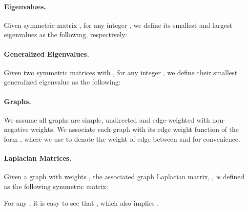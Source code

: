 \documentclass{article}
\def\ngap{}
\begin{document}
\paragraph{Eigenvalues.} Given symmetric matrix ,
for any integer , we define its  smallest and
largest eigenvalues as the following, respectively:
\quad\quad 

\paragraph{Generalized Eigenvalues.} Given two symmetric matrices
 with , for any integer , we define their  smallest generalized
eigenvalue as the following:
 
\paragraph{Graphs.} We assume all graphs are simple, undirected and
edge-weighted with non-negative weights. We associate each graph with
its edge weight function of the form , where
we use  to denote the weight of edge between  and  for
convenience.

\smallskip
\paragraph{Laplacian Matrices.} Given a graph with weights
, the associated graph Laplacian matrix, , is defined as the following symmetric matrix:
 
For any , it is easy to see that
, which also implies .
\ngap
\end{document}
